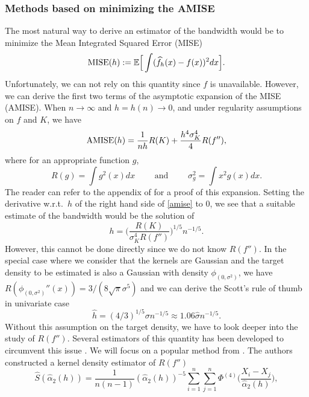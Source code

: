 \subsubsection{Methods based on minimizing the AMISE}
The most natural way to derive an estimator of the bandwidth would be to minimize the Mean Integrated Squared Error (MISE)
\begin{equation}
    \label{mise}
    \textnormal{MISE}(h) := {\mathbb E}\Big[\int(\widehat f_h(x)-f(x))^2dx \Big].
\end{equation}
Unfortunately, we can not rely on this quantity since $f$ is unavailable. However, we can derive the first two terms of the asymptotic expansion of the MISE (AMISE). When $n\rightarrow\infty$ and $h=h(n)\rightarrow 0$, and under regularity assumptions on $f$ and $K$, we have
\begin{equation}
\label{amise}
    \textnormal{AMISE}(h) = \frac{1}{nh}R(K) +\frac{h^4\sigma^4_K}{4}R(f''),
\end{equation}
where for an appropriate function $g$, 
$$
R(g)=\int g^2(x) dx\qquad\text{ and }\qquad\sigma_g^2=\int x^2g(x) dx.
$$ 
The reader can refer to the appendix of \citep{tsybakov2009Nonparametric} for a proof of this expansion. 
Setting the derivative w.r.t.\ $h$ of the right hand side of \cref{amise} to $0$, we see that a suitable estimate 
of the bandwidth would be the solution of
\begin{equation}
\label{amise_diff_sol}
    h = \bigg(\frac{R(K)}{\sigma_K^4R(f'')}\bigg)^{1/5}n^{-1/5}.
\end{equation}
However, this cannot be done directly since we do not know $R(f'')$.  In the special case where we consider that 
the kernels are Gaussian and the target density to be estimated is also a Gaussian with density $\phi_{(0,\sigma^2)}$, we have $R(\phi_{(0,\sigma^2)}''(x)) = 3/(8\sqrt{\pi}\sigma^5)$ and we can derive the Scott's rule of thumb in univariate case \citep{scott_multivariate_2015}
\begin{equation}
    \hat h = (4/3)^{1/5}\sigma n^{-1/5} \approx 1.06\hat\sigma n^{-1/5}.
\end{equation}
Without this assumption on the target density, we have to look deeper into the study of $R(f'')$. Several estimators of this quantity has been developed to circumvent this issue \citep{HallMarron87, sheatherj91, sheather_bdwth}. We will focus on a popular method from \citep{sheather_bdwth}. The authors constructed a kernel density estimator of $R(f'')$
\begin{equation}
\label{sj_est_f2}
    \hat S(\hat\alpha_2(h)) = \frac{1}{n(n-1)}(\hat\alpha_2(h))^{-5}\sum_{i=1}^n\sum_{j=1}^n\Phi^{(4)}\Big(\frac{X_i-X_j}{\hat\alpha_2(h)}\Big),
\end{equation}

